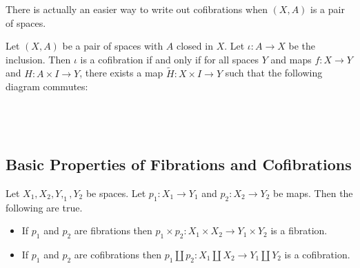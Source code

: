 \documentclass[a4paper]{article}
\begin{document}
There is actually an easier way to write out cofibrations when $(X,A)$ is a pair of spaces. 

\begin{lmm}{}{} Let $(X,A)$ be a pair of spaces with $A$ closed in $X$. Let $\iota:A\to X$ be the inclusion. Then $\iota$ is a cofibration if and only if for all spaces $Y$ and maps $f:X\to Y$ and $H:A\times I\to Y$, there exists a map $\tilde{H}:X\times I\to Y$ such that the following diagram commutes: \\~\\
\\~\\
\end{lmm}

\subsection{Basic Properties of Fibrations and Cofibrations}
\begin{prp}{}{} Let $X_1,X_2,Y,_1,Y_2$ be spaces. Let $p_1:X_1\to Y_1$ and $p_2:X_2\to Y_2$ be maps. Then the following are true. 
\begin{itemize}
\item If $p_1$ and $p_2$ are fibrations then $p_1\times p_2:X_1\times X_2\to Y_1\times Y_2$ is a fibration. 
\item If $p_1$ and $p_2$ are cofibrations then $p_1\coprod p_2:X_1\coprod X_2\to Y_1\coprod Y_2$ is a cofibration. 
\end{itemize}
\end{prp}
\end{document}
